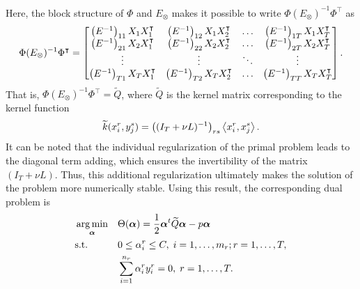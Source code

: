 Here, the block structure of $\Phi$ and $E_\otimes$ makes it possible to write $\Phi (E_\otimes)^{-1} \Phi^\intercal$ as
\begin{equation}
    \label{eq:laplacian_block_linear}
    \Phi (E_\otimes)^{-1} \Phi^\intercal =
    \begin{bmatrix}
        \left(E^{-1}\right)_{11} X_1 X_1^\intercal             & \left(E^{-1}\right)_{12} X_1 X_2^\intercal              & \ldots & \left(E^{-1}\right)_{1\ntasks} X_1 X_\ntasks^\intercal              \\
        \left(E^{-1}\right)_{21} X_2 X_1^\intercal             & \left(E^{-1}\right)_{22} X_2 X_2^\intercal              & \ldots & \left(E^{-1}\right)_{2\ntasks} X_2 X_\ntasks^\intercal              \\
        \vdots                                                 & \vdots                                                  & \ddots & \vdots                                                              \\
        \left(E^{-1}\right)_{\ntasks1} X_\ntasks X_1^\intercal & \left(E^{-1}\right)_{\ntasks 2} X_\ntasks X_2^\intercal & \ldots & \left(E^{-1}\right)_{\ntasks \ntasks} X_\ntasks X_\ntasks^\intercal \\
    \end{bmatrix} .
\end{equation}
That is, $\Phi (E_\otimes)^{-1} \Phi^\intercal = \widetilde{Q}$, where $ \widetilde{Q}$ is the kernel matrix corresponding to the kernel function
\begin{equation}
    \label{eq:kernelfun_gl}
    \widetilde{k}(x_i^r, y_j^s) =  \left((I_T + \nu L)^{-1}\right)_{rs} \dotp{x_i^r}{x_j^s}.
\end{equation}
It can be noted that the individual regularization of the primal problem leads to the diagonal term adding, which ensures the invertibility of the matrix $(I_T + \nu L)$.
Thus, this additional regularization ultimately makes the solution of the problem more numerically stable.
Using this result, the corresponding dual problem is
\begin{equation}\label{eq:linear_gl_dual}
    \begin{aligned}
         & \argmin_{\fv{\alpha}}
         &                       & \Theta(\fv{\alpha}) = \frac{1}{2} \fv{\alpha}^t \widetilde{Q} \fv{\alpha} - p \fv{\alpha}                                                             \\
         & \text{s.t.}
         &                       & 0 \leq \alpha_i^r \leq C, \;  i=1,\ldots,m_r; r=1,\ldots,T ,                                                                                          \\
         &                       &                                                                                           & \sum_{i=1}^{n_r}{\alpha_i^r y_i^r} = 0, \; r=1,\ldots,T .
    \end{aligned}
\end{equation}

